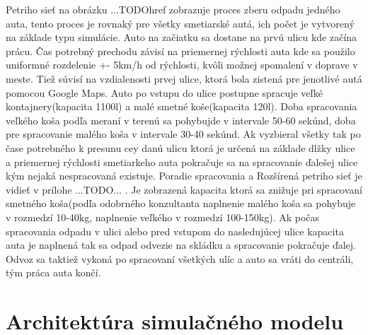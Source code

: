 \documentclass[11pt,a4paper]{article}
\begin{document}
    \indent Petriho sieť na obrázku ...TODOhref zobrazuje proces zberu odpadu jedného auta, tento proces je rovnaký pre všetky smetiarské autá, ich počet je vytvorený na základe typu simulácie. Auto na začiatku sa dostane na prvú ulicu kde začína prácu. Čas potrebný prechodu závisí na priemernej rýchlosti auta kde sa použilo uniformné rozdelenie +- 5km/h od rýchlosti, kvôli možnej spomalení v doprave v meste. Tiež súvisí na vzdialenosti prvej ulice, ktorá bola zistená pre jenotlivé autá pomocou Google Maps. Auto po vstupu do ulice postupne spracuje veľké kontajnery(kapacita 1100l) a malé smetné koše(kapacita 120l). Doba spracovania veľkého koša podľa meraní v terenú sa pohybujde v intervale 50-60 sekúnd, doba pre spracovanie malého koša v intervale 30-40 sekúnd. Ak vyzbieral všetky tak po čase potrebného k presunu cey danú ulicu ktorá je určená na základe dlžky ulice a priemernej rýchlosti smetiarkeho auta pokračuje sa na spracovanie ďalešej ulice kým nejaká nespracovaná existuje. Poradie spracovania a 
    Rozšírená petriho sieť je vidieť v prílohe ...TODO... . Je zobrazená kapacita ktorá sa znižuje pri spracovaní smetného koša(podľa odobrného konzultanta naplnenie malého koša sa pohybuje v rozmedzí 10-40kg, naplnenie veľkého v rozmedzí 100-150kg). Ak počas spracovania odpadu v ulici  alebo pred vstupom do nasledujúcej ulice kapacita auta je naplnená tak sa odpad odvezie na skládku a spracovanie pokračuje ďalej. Odvoz sa taktiež vykoná po spracovaní všetkých ulíc a auto sa vráti do centráli, tým práca auta končí. 


\section{Architektúra simulačného modelu}
\end{document}

